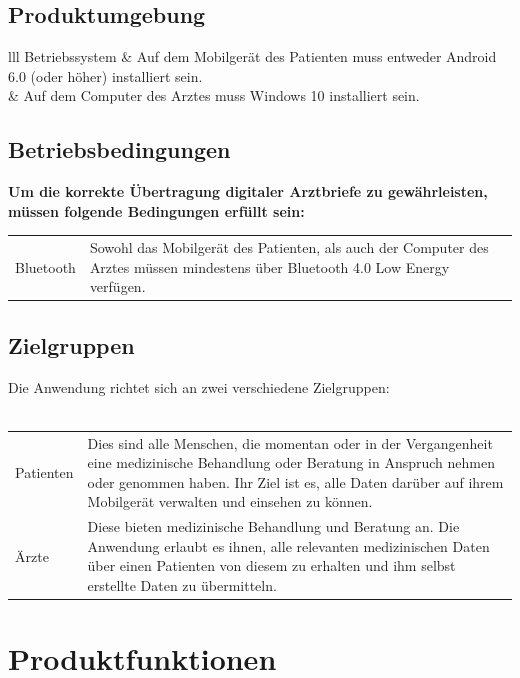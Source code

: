 \documentclass[a4paper]{scrreprt}
\begin{document}
\section{Produktumgebung}
\begin{tabular}{lll}
{Betriebssystem} &   {Auf dem Mobilgerät des Patienten muss entweder Android 6.0 (oder höher) installiert sein.}\\
{} &  {Auf dem Computer des Arztes muss Windows 10 installiert sein.} \\
\end{tabular} 

\section{Betriebsbedingungen}
{\textbf{Um die korrekte Übertragung digitaler Arztbriefe zu gewährleisten, müssen folgende Bedingungen erfüllt sein:}} \newline\newline
\begin{tabular}{lll}
\gls{Bluetooth} & \multicolumn{2}{p{11.5cm}}{Sowohl das Mobilgerät des Patienten, als auch der Computer des Arztes müssen mindestens über \gls{Bluetooth} 4.0 Low Energy verfügen.} \\
\end{tabular} 
 
\section{Zielgruppen}
Die Anwendung richtet sich an zwei verschiedene Zielgruppen:  \\\\
\begin{tabular}{lll}
Patienten &  \multicolumn{2}{p{12cm}}{Dies sind alle Menschen, die momentan oder in der Vergangenheit eine medizinische Behandlung oder Beratung in Anspruch nehmen oder genommen haben. Ihr Ziel ist es, alle Daten darüber auf ihrem Mobilgerät verwalten und einsehen zu können.}\\
Ärzte &  \multicolumn{2}{p{12cm}}{Diese bieten medizinische Behandlung und Beratung an. Die Anwendung erlaubt es ihnen, alle relevanten medizinischen Daten über einen Patienten von diesem zu erhalten und ihm selbst erstellte Daten zu übermitteln.}  \\
\end{tabular}

\chapter{Produktfunktionen}
\end{document}
